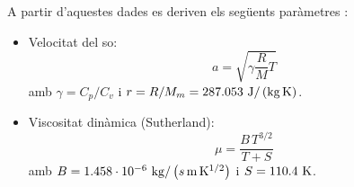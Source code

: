 \noindent
A partir d'aquestes dades es deriven els següents paràmetres \cite{gallais}:
\begin{itemize}
    \item Velocitat del so:
    \begin{equation}
        a = \sqrt{\gamma \frac{R}{M} T}
    \end{equation}
    amb $\gamma = C_p / C_v$ i $r= R / M_m =287.053 \ \joule/ \left( \kilo\gram \, \kelvin \right)$.
    \item Viscositat dinàmica (Sutherland):
    \begin{equation}
        \mu = \frac{B \, T^{3/2}}{T+S}
    \end{equation}
    amb $B = 1.458 \cdot 10^{-6} \ \kilo\gram / \left( s \, \meter \, \kelvin^{1/2} \right)$ i $S = 110.4 \ \kelvin$.
\end{itemize}














